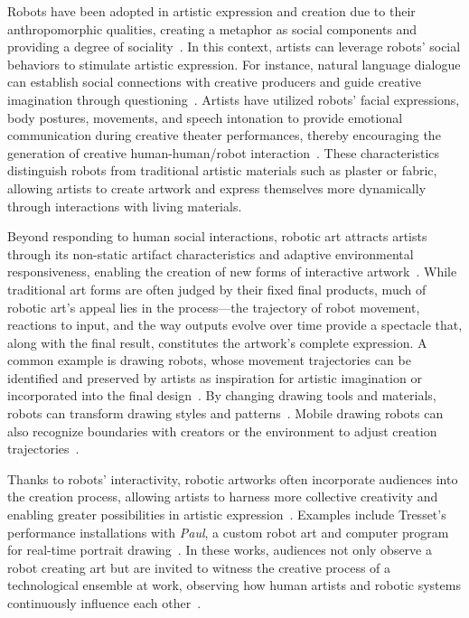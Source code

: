 Robots have been adopted in artistic expression and creation due to their anthropomorphic qualities, creating a metaphor as social components and providing a degree of sociality~\cite{jeon2017robotic,kahn2014creative}. In this context, artists can leverage robots' social behaviors to stimulate artistic expression. For instance, natural language dialogue can establish social connections with creative producers and guide creative imagination through questioning~\cite{kahn2016human, hu2021exploring}. Artists have utilized robots' facial expressions, body postures, movements, and speech intonation to provide emotional communication during creative theater performances, thereby encouraging the generation of creative human-human/robot interaction~\cite{knight2011eight, li2023nice}. These characteristics distinguish robots from traditional artistic materials such as plaster or fabric, allowing artists to create artwork and express themselves more dynamically through interactions with living materials.

Beyond responding to human social interactions, robotic art attracts artists through its non-static artifact characteristics and adaptive environmental responsiveness, enabling the creation of new forms of interactive artwork~\cite{nelkin1984science}. While traditional art forms are often judged by their fixed final products, much of robotic art's appeal lies in the process—the trajectory of robot movement, reactions to input, and the way outputs evolve over time provide a spectacle that, along with the final result, constitutes the artwork's complete expression. A common example is drawing robots, whose movement trajectories can be identified and preserved by artists as inspiration for artistic imagination or incorporated into the final design~\cite{lin2020your}. By changing drawing tools and materials, robots can transform drawing styles and patterns~\cite{jeon2017robotic, tresset2013portrait, lin2020your}. Mobile drawing robots can also recognize boundaries with creators or the environment to adjust creation trajectories~\cite{moura2007new, lin2020your}.

Thanks to robots' interactivity, robotic artworks often incorporate audiences into the creation process, allowing artists to harness more collective creativity and enabling greater possibilities in artistic expression~\cite{vavara2022, mikalauskas2018improvising}. Examples include Tresset's performance installations with \textit{Paul}, a custom robot art and computer program for real-time portrait drawing~\cite{tresset2014artistically}. In these works, audiences not only observe a robot creating art but are invited to witness the creative process of a technological ensemble at work, observing how human artists and robotic systems continuously influence each other~\cite{chung2022sketching, gomez2021robot, tresset2014artistically}.

